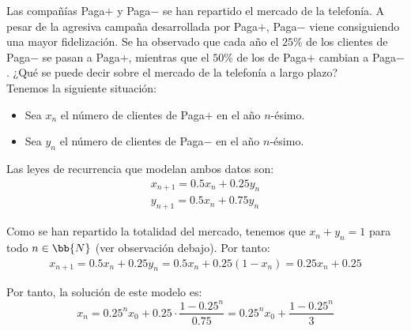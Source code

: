 \begin{ejercicio}
    Las compañías Paga$+$ y Paga$-$ se han repartido el mercado de la telefonía. A pesar de la agresiva campaña desarrollada por Paga$+$, Paga$-$ viene consiguiendo una mayor fidelización. Se ha observado que cada año el $25\%$ de los clientes de Paga$-$ se pasan a Paga$+$, mientras que el $50\%$ de los de Paga$+$ cambian a Paga$-$. ¿Qué se puede decir sobre el mercado de la telefonía a largo plazo?\\

    Tenemos la siguiente situación:
    \begin{figure}[H]
        \centering
    \end{figure}

    \begin{itemize}
        \item Sea $x_n$ el número de clientes de Paga$+$ en el año $n$-ésimo.
        \item Sea $y_n$ el número de clientes de Paga$-$ en el año $n$-ésimo.
    \end{itemize}

    Las leyes de recurrencia que modelan ambos datos son:
    \begin{gather*}
        x_{n+1} = 0.5x_n + 0.25y_n \\
        y_{n+1} = 0.5x_n + 0.75y_n
    \end{gather*}

    Como se han repartido la totalidad del mercado, tenemos que $x_n + y_n = 1$ para todo $n\in \bb{N}$ (ver observación debajo). Por tanto:
    \begin{gather*}
        x_{n+1} = 0.5x_n + 0.25y_n = 0.5x_n +0.25(1-x_n) = 0.25x_n + 0.25
    \end{gather*}

    Por tanto, la solución de este modelo es:
    \begin{equation*}
        x_n = 0.25^nx_0 + 0.25\cdot \frac{1-0.25^n}{0.75} = 0.25^nx_0 + \frac{1-0.25^n}{3}
    \end{equation*}


\end{ejercicio}
